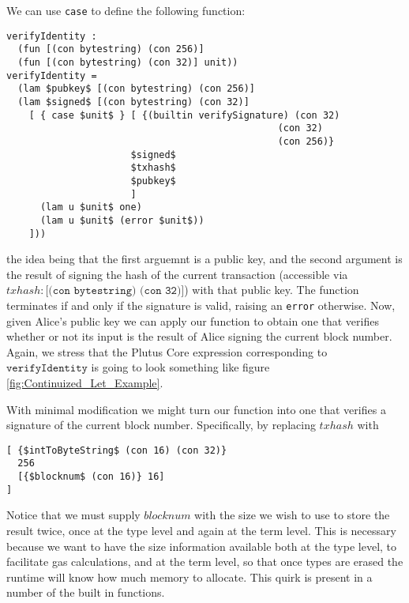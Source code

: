 \documentclass[../plutus-core-specification.tex]{subfiles}
\begin{document}
We can use \texttt{case} to define the following function:
\begin{lstlisting}[basicstyle=\ttfamily,mathescape]
verifyIdentity :
  (fun [(con bytestring) (con 256)]
  (fun [(con bytestring) (con 32)] unit))
verifyIdentity =
  (lam $pubkey$ [(con bytestring) (con 256)]
  (lam $signed$ [(con bytestring) (con 32)]
    [ { case $unit$ } [ {(builtin verifySignature) (con 32)
                                                (con 32)
                                                (con 256)}
                      $signed$
                      $txhash$
                      $pubkey$
                      ]
      (lam u $unit$ one)
      (lam u $unit$ (error $unit$))
    ]))
\end{lstlisting}
the idea being that the first arguemnt is a public key, and the second argument is the result of signing the hash of the current transaction (accessible via $txhash : \texttt{[(con bytestring) (con 32)]}$) with that public key. The function terminates if and only if the signature is valid, raising an \texttt{error} otherwise. Now, given Alice's public key we can apply our function to obtain one that verifies whether or not its input is the result of Alice signing the current block number. Again, we stress that the Plutus Core expression corresponding to $\texttt{verifyIdentity}$ is going to look something like figure \ref{fig:Continuized_Let_Example}.

With minimal modification we might turn our function into one that verifies a signature of the current block number. Specifically, by replacing $txhash$ with
\begin{lstlisting}[basicstyle=\ttfamily,mathescape]
[ {$intToByteString$ (con 16) (con 32)}
  256
  [{$blocknum$ (con 16)} 16]
]
\end{lstlisting}
Notice that we must supply $blocknum$ with the size we wish to use to store the result twice, once at the type level and again at the term level. This is necessary because we want to have the size information available both at the type level, to facilitate gas calculations, and at the term level, so that once types are erased the runtime will know how much memory to allocate. This quirk is present in a number of the built in functions.
\end{document}
